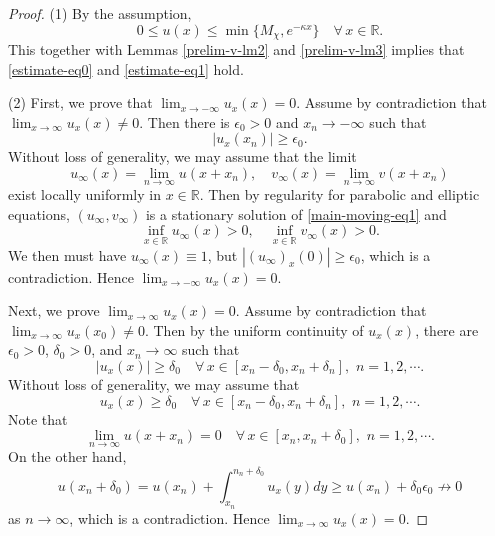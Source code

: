 \documentclass[11pt]{article} %
\theoremstyle{remark}
\theoremstyle{remark}
\numberwithin{equation}{section}
\numberwithin{figure}{section}
\numberwithin{table}{section}
\newcommand\RR{\ensuremath{\mathbb{R}}}
\begin{document}
\begin{proof} 
(1) By the assumption, 
\begin{equation}
\label{proof-estimate-eq1}
0\le u(x)\le \min\{M_{\chi} ,e^{-\kappa x}\}\quad  \forall\, x\in\RR.
\end{equation}
This together with Lemmas \ref{prelim-v-lm2} and \ref{prelim-v-lm3}  implies that \eqref{estimate-eq0} and \eqref{estimate-eq1}  hold.



\smallskip

(2)  First, we 
 prove that $\lim_{x\to -\infty} u_x(x)=0$. Assume by contradiction that 
$\lim_{x\to\infty}u_x(x)\not =0$. Then there is $\epsilon_0>0$ and $x_n\to-\infty$ such that
$$
|u_x(x_n)|\ge \epsilon_0.
$$
Without loss of generality, we may assume that 
the limit
$$
u_\infty(x)=\lim_{n\to\infty} u(x+x_n),\quad v_\infty(x)=\lim_{n\to\infty} v(x+x_n)
$$
exist locally uniformly in $x\in\RR$. Then by regularity for parabolic and elliptic equations,
 $(u_\infty,v_\infty)$ is a stationary solution of \eqref{main-moving-eq1} and
$$
\inf_{x\in\RR} u_\infty (x)>0,\quad \inf_{x\in\RR}v_\infty(x)>0.
$$
We then must have $u_\infty(x)\equiv 1$, but
$|(u_\infty)_x(0)|\ge \epsilon_0$, which is a contradiction. Hence
$\lim_{x\to -\infty} u_x(x)=0$. 

\smallskip

Next, we prove $\lim_{x\to\infty}u_x(x)=0$. Assume by contradiction that $\lim_{x\to\infty} u_x(x_0)\not =0$.
Then by the uniform continuity of $u_x(x)$,  there are $\epsilon_0>0$, $\delta_0>0$, and $x_n\to\infty$ such that
$$
|u_x(x)|\ge \delta_0\quad \forall\, x\in [x_n-\delta_0,x_n+\delta_n],\,\, n=1,2, \cdots.
$$
Without loss of generality, we may assume that
$$
u_x(x)\ge \delta_0\quad \forall\, x\in [x_n-\delta_0,x_n+\delta_n],\,\, n=1,2, \cdots.
$$
Note that
$$
\lim_{n\to\infty} u(x+x_n)=0\quad \forall\, x\in [x_n,x_n+\delta_0],\,\, n=1,2,\cdots.
$$
On the other hand, 
$$
u(x_n+\delta_0)=u(x_n)+\int_{x_n}^{n_n+\delta_0} u_x(y)dy\ge u(x_n)+\delta_0 \epsilon_0\not \to 0
$$
as $n\to\infty$, which is a contradiction.
Hence $\lim_{x\to\infty}u_x(x)=0$.

\smallskip






\end{proof}
\end{document}
